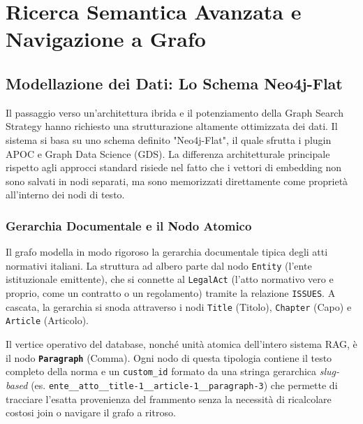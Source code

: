 \chapter{Ricerca Semantica Avanzata e Navigazione a Grafo}\label{chap:graph_search}

\inlineminitoc

\section{Modellazione dei Dati: Lo Schema Neo4j-Flat}
Il passaggio verso un'architettura ibrida e il potenziamento della Graph Search Strategy hanno richiesto una strutturazione altamente ottimizzata dei dati. Il sistema si basa su uno schema definito "Neo4j-Flat", il quale sfrutta i plugin APOC e Graph Data Science (GDS). La differenza architetturale principale rispetto agli approcci standard risiede nel fatto che i vettori di embedding non sono salvati in nodi separati, ma sono memorizzati direttamente come proprietà all'interno dei nodi di testo.

\subsection{Gerarchia Documentale e il Nodo Atomico}
Il grafo modella in modo rigoroso la gerarchia documentale tipica degli atti normativi italiani. La struttura ad albero parte dal nodo \texttt{Entity} (l'ente istituzionale emittente), che si connette al \texttt{LegalAct} (l'atto normativo vero e proprio, come un contratto o un regolamento) tramite la relazione \texttt{ISSUES}. A cascata, la gerarchia si snoda attraverso i nodi \texttt{Title} (Titolo), \texttt{Chapter} (Capo) e \texttt{Article} (Articolo). 

Il vertice operativo del database, nonché unità atomica dell'intero sistema RAG, è il nodo \textbf{\texttt{Paragraph}} (Comma). Ogni nodo di questa tipologia contiene il testo completo della norma e un \texttt{custom\_id} formato da una stringa gerarchica \textit{slug-based} (es. \texttt{ente\_\_atto\_\_title-1\_\_article-1\_\_paragraph-3}) che permette di tracciare l'esatta provenienza del frammento senza la necessità di ricalcolare costosi join o navigare il grafo a ritroso.

